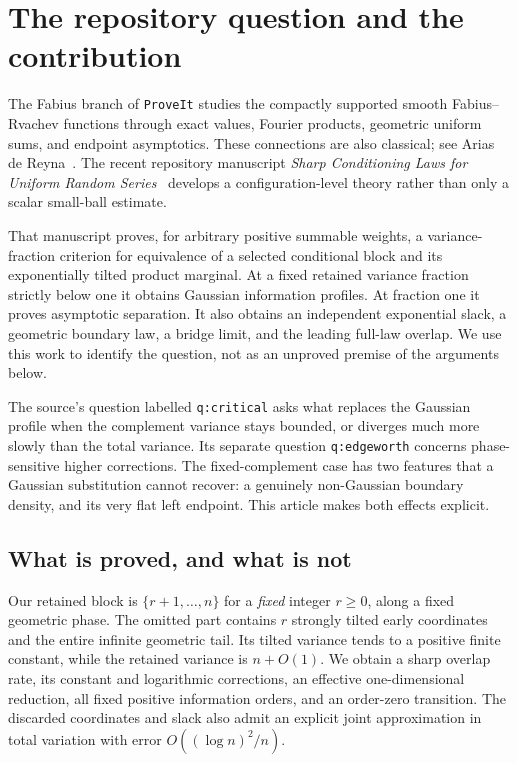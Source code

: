 \documentclass[11pt,oneside]{article}
\numberwithin{equation}{section}
\theoremstyle{plain}
\theoremstyle{definition}
\theoremstyle{remark}
\newcommand{\repo}{\texttt{ProveIt}}
\begin{document}
\hypersetup{pageanchor=true}

{\small\setlength{\parskip}{0pt}\tableofcontents}
\newpage

\section{The repository question and the contribution}
\label{sec:context}
The Fabius branch of \repo{} studies the compactly supported smooth
Fabius--Rvachev functions through exact values, Fourier products,
geometric uniform sums, and endpoint asymptotics. These connections are
also classical; see Arias de Reyna~\cite{arias,arithmetic}. The recent
repository manuscript \emph{Sharp Conditioning Laws for Uniform Random
Series}~\cite{repoSharp} develops a configuration-level theory rather
than only a scalar small-ball estimate.

That manuscript proves, for arbitrary positive summable weights, a
variance-fraction criterion for equivalence of a selected conditional
block and its exponentially tilted product marginal. At a fixed retained
variance fraction strictly below one it obtains Gaussian information
profiles. At fraction one it proves asymptotic separation. It also obtains
an independent exponential slack, a geometric boundary law, a bridge
limit, and the leading full-law overlap. We use this work to identify the
question, not as an unproved premise of the arguments below.

The source's question labelled \texttt{q:critical} asks what replaces the
Gaussian profile when the complement variance stays bounded, or diverges
much more slowly than the total variance. Its separate question
\texttt{q:edgeworth} concerns phase-sensitive higher corrections. The
fixed-complement case has two features that a Gaussian substitution cannot
recover: a genuinely non-Gaussian boundary density, and its very flat left
endpoint. This article makes both effects explicit.

\subsection{What is proved, and what is not}
Our retained block is $\{r+1,\ldots,n\}$ for a \emph{fixed} integer
$r\ge0$, along a fixed geometric phase. The omitted part contains $r$
strongly tilted early coordinates and the entire infinite geometric tail.
Its tilted variance tends to a positive finite constant, while the
retained variance is $n+O(1)$. We obtain a sharp overlap rate, its constant
and logarithmic corrections, an effective one-dimensional reduction,
all fixed positive information orders, and an order-zero transition.
The discarded coordinates and slack also admit an explicit joint
approximation in total variation with error $O((\log n)^2/n)$.
\end{document}
